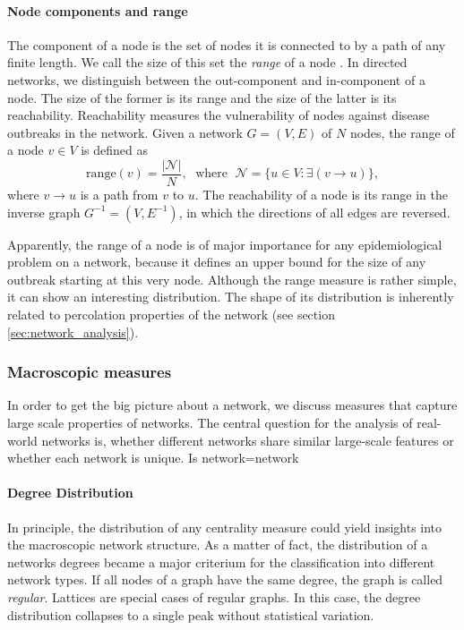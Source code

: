 \paragraph{Node components and range\color{Cayenne}{.}}
The component of a node is the set of nodes it is connected to by a path of any finite length.
We call the size of this set the \emph{range} of a node \citep{Lentz:2012pre}.
In directed networks, we distinguish between the out-component and in-component of a node.
The size of the former is its range and the size of the latter is its reachability.
Reachability measures the vulnerability of nodes against disease outbreaks in the network.
Given a network $G=(V,E)$ of $N$ nodes, the range of a node $v \in V$ is defined as
\begin{equation}\label{eq:range_def}
\mathrm{range}(v)=\frac{\left| \mathcal{N} \right| }{N}, \; \text{ where } \; \mathcal{N}=\{u \in V:\exists ( v\rightarrow u )\},
\end{equation}
where $ v\rightarrow u $ is a path from $v$ to $u$.
The reachability of a node is its range in the inverse graph $G^{-1}=(V,E^{-1})$, in which the directions of all edges are reversed. 

Apparently, the range of a node is of major importance for any epidemiological problem on a network, because it defines an upper bound for the size of any outbreak starting at this very node. 
Although the range measure is rather simple, it can show an interesting distribution.
The shape of its distribution is inherently related to percolation properties of the network (see section \ref{sec:network_analysis}).


\subsubsection{Macroscopic measures}\label{sec:macro_measures}
In order to get the big picture about a network, we discuss measures that capture large scale properties of networks.
The central question for the analysis of real-world networks is, whether different networks share similar large-scale features or whether each network is unique.
Is network=network\textbf{\textsf{\color{Cayenne}{?}}}

\paragraph{Degree Distribution\color{Cayenne}{.}}
In principle, the distribution of any centrality measure could yield insights into the macroscopic network structure.
As a matter of fact, the distribution of a networks degrees became a major criterium for the classification into different network types.
If all nodes of a graph have the same degree, the graph is called \emph{regular}.
Lattices are special cases of regular graphs.
In this case, the degree distribution collapses to a single peak without statistical variation.

